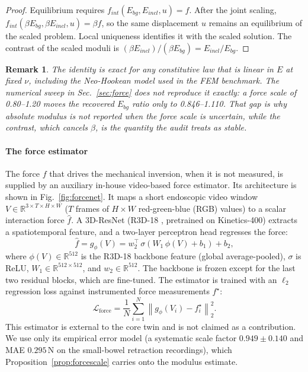 \documentclass[pdflatex,lineno,referee,sn-vancouver,Numbered]{sn-jnl}
\newtheorem{remark}{Remark}
\begin{document}
\begin{proof}
Equilibrium requires $f_{int}(E_{bg}, E_{incl}, u) = f$. After the joint
scaling, $f_{int}(\beta E_{bg}, \beta E_{incl}, u) = \beta f$, so the same
displacement $u$ remains an equilibrium of the scaled problem. Local
uniqueness identifies it with the scaled solution. The contrast
of the scaled moduli is $(\beta E_{incl})/(\beta E_{bg}) = E_{incl}/E_{bg}$.
\end{proof}

\begin{remark}
\label{rem:nonlinear}
The identity is exact for any constitutive law that is linear in $E$ at
fixed $\nu$, including the Neo-Hookean model used in the FEM benchmark.
The numerical sweep in Sec.~\ref{sec:force} does not reproduce it exactly:
a force scale of 0.80--1.20 moves the recovered $E_{bg}$ ratio only to
0.846--1.110. That gap is why absolute modulus is not reported when the
force scale is uncertain, while the contrast, which cancels $\beta$, is
the quantity the audit treats as stable.
\end{remark}

\paragraph{The force estimator}
\label{sec:forceest}
The force $f$ that drives the mechanical inversion, when it is not
measured, is supplied by an auxiliary in-house video-based force estimator. Its
architecture is shown in Fig.~\ref{fig:forcenet}. It maps a short
endoscopic video window
$V \in \mathbb{R}^{3 \times T \times H \times W}$ ($T$ frames of
$H \times W$ red-green-blue (RGB) values) to a scalar interaction force
$\hat{f}$. A 3D-ResNet
(R3D-18 \cite{r3d}, pretrained on Kinetics-400) extracts a spatiotemporal
feature, and a two-layer perceptron head regresses the force:
\begin{equation}
\hat{f} = g_{\phi}(V) = w_{2}^{\top}\,\sigma\!\left(W_{1}\,\phi(V) + b_{1}\right) + b_{2},
\label{eq:forcenet}
\end{equation}
where $\phi(V) \in \mathbb{R}^{512}$ is the R3D-18 backbone feature (global
average-pooled), $\sigma$ is ReLU, $W_{1} \in \mathbb{R}^{512 \times 512}$,
and $w_{2} \in \mathbb{R}^{512}$. The backbone is frozen except for the last
two residual blocks, which are fine-tuned. The estimator is trained with an
$\ell_{2}$ regression loss against instrumented force measurements
$f^{\star}$:
\begin{equation}
\mathcal{L}_{\text{force}} = \frac{1}{N}\sum_{i=1}^{N}\left\lVert g_{\phi}(V_{i}) - f^{\star}_{i}\right\rVert_{2}^{2}.
\label{eq:forceloss}
\end{equation}
This estimator is external to the core twin and is not claimed as a
contribution. We use only its empirical error model (a systematic scale
factor $0.949 \pm 0.140$ and MAE
$0.295$\,N on the small-bowel retraction recordings), which
Proposition~\ref{prop:forcescale} carries onto the modulus estimate.
\end{document}
